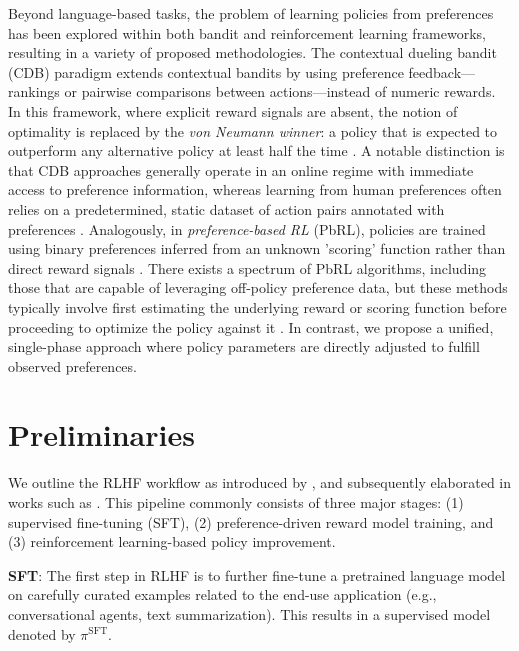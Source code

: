 Beyond language-based tasks, the problem of learning policies from preferences has been explored within both bandit and reinforcement learning frameworks, resulting in a variety of proposed methodologies. The contextual dueling bandit (CDB) paradigm \citep{yue2012karmed,dudik2015contextual} extends contextual bandits by using preference feedback—rankings or pairwise comparisons between actions—instead of numeric rewards. In this framework, where explicit reward signals are absent, the notion of optimality is replaced by the \textit{von Neumann winner}: a policy that is expected to outperform any alternative policy at least half the time \citep{dudik2015contextual}. A notable distinction is that CDB approaches generally operate in an online regime with immediate access to preference information, whereas learning from human preferences often relies on a predetermined, static dataset of action pairs annotated with preferences \citep{yan2022human}. Analogously, in \textit{preference-based RL} (PbRL), policies are trained using binary preferences inferred from an unknown 'scoring' function rather than direct reward signals \citep{BusaFekete2014,ruiz2023dueling}. There exists a spectrum of PbRL algorithms, including those that are capable of leveraging off-policy preference data, but these methods typically involve first estimating the underlying reward or scoring function before proceeding to optimize the policy against it \citep{jain2013learning,BusaFekete2014,christiano2017deep,sadigh2017active,kupcsik2018learning}. In contrast, we propose a unified, single-phase approach where policy parameters are directly adjusted to fulfill observed preferences.

\section{Preliminaries}\label{section:prelims}

We outline the RLHF workflow as introduced by \citeauthor{ziegler2020finetuning}, and subsequently elaborated in works such as \citep{stiennon2022learning, bai2022training, ouyang2022training}. This pipeline commonly consists of three major stages: (1) supervised fine-tuning (SFT), (2) preference-driven reward model training, and (3) reinforcement learning-based policy improvement.

\textbf{SFT}: The first step in RLHF is to further fine-tune a pretrained language model on carefully curated examples related to the end-use application (e.g., conversational agents, text summarization). This results in a supervised model denoted by $\pi^\text{SFT}$. 

